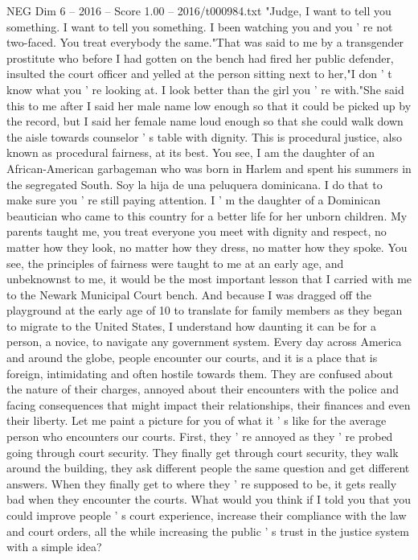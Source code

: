 \begin{textsample}{NEG Dim 6 – 2016 – Score 1.00 – 2016/t000984.txt}  \label{ex:f6_neg_035}
"Judge, I want to tell you something.
I want to tell you something.
I been watching you and you ' re not two-faced.
You treat everybody the same."That was said to me by a transgender prostitute who before I had gotten on the bench had fired her public defender, insulted the court officer and yelled at the person sitting next to her,"I don ' t know what you ' re looking at.
I look better than the girl you ' re with."She said this to me after I said her male name low enough so that it could be picked up by the record, but I said her female name loud enough so that she could walk down the aisle towards counselor ' s table with dignity.
This is procedural justice, also known as procedural fairness, at its best.
You see, I am the daughter of an African-American garbageman who was born in Harlem and spent his summers in the segregated South.
Soy la hija de una peluquera dominicana.
I do that to make sure you ' re still paying attention.
I ' m the daughter of a Dominican beautician who came to this country for a better life for her unborn children.
My parents taught me, you treat everyone you meet with dignity and respect, no matter how they look, no matter how they dress, no matter how they spoke.
You see, the principles of fairness were taught to me at an early age, and unbeknownst to me, it would be the most important lesson that I carried with me to the Newark Municipal Court bench.
And because I was dragged off the playground at the early age of 10 to translate for family members as they began to migrate to the United States, I understand how daunting it can be for a person, a novice, to navigate any government system.
Every day across America and around the globe, people encounter our courts, and it is a place that is foreign, intimidating and often hostile towards them.
They are confused about the nature of their charges, annoyed about their encounters with the police and facing consequences that might impact their relationships, their finances and even their liberty.
Let me paint a picture for you of what it ' s like for the average person who encounters our courts.
First, they ' re annoyed as they ' re probed going through court security.
They finally get through court security, they walk around the building, they ask different people the same question and get different answers.
When they finally get to where they ' re supposed to be, it gets really bad when they encounter the courts.
What would you think if I told you that you could improve people ' s court experience, increase their compliance with the law and court orders, all the while increasing the public ' s trust in the justice system with a simple idea?

\end{textsample}
